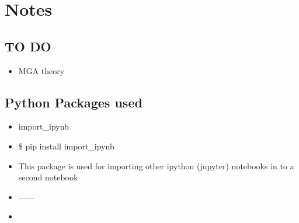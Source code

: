 

\section{Notes}

\subsection{TO DO}

\begin{itemize}
    \item MGA theory
\end{itemize}{}

\subsection{Python Packages used}

\begin{itemize}
    \item import\_ipynb
    \item \$ pip install import\_ipynb
    \item This package is used for importing other ipython (jupyter) notebooks in to a second notebook
    \item ------
    \item 
\end{itemize}{}